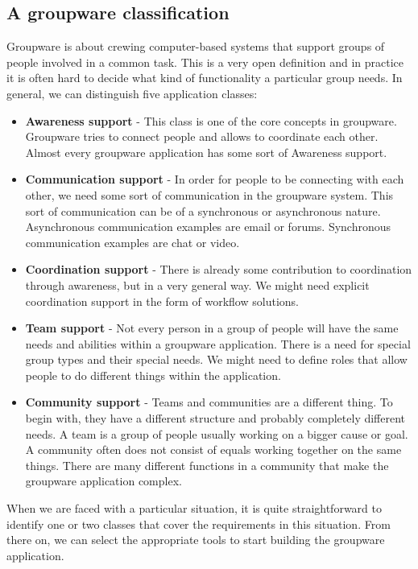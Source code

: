 
\subsection{A groupware classification}

Groupware is about crewing computer-based systems that support groups of people involved in a common task. This is a very open definition and in practice it is often hard to decide what kind of functionality a particular group needs. In general, we can distinguish five application classes:

\begin{itemize}
\item{\textbf{Awareness support} - This class is one of the core concepts in groupware. Groupware tries to connect people and allows to coordinate each other. Almost every groupware application has some sort of Awareness support.}
\item{\textbf{Communication support} - In order for people to be connecting with each other, we need some sort of communication in the groupware system. This sort of communication can be of a synchronous or asynchronous nature. Asynchronous communication examples are email or forums. Synchronous communication examples are chat or video.}
\item{\textbf{Coordination support} - There is already some contribution to coordination through awareness, but in a very general way. We might need explicit coordination support in the form of workflow solutions.}
\item{\textbf{Team support} - Not every person in a group of people will have the same needs and abilities within a groupware application. There is a need for special group types and their special needs. We might need to define roles that allow people to do different things within the application.}
\item{\textbf{Community support} - Teams and communities are a different thing. To begin with, they have a different structure and probably completely different needs. A team is a group of people usually working on a bigger cause or goal. A community often does not consist of equals working together on the same things. There are many different functions in a community that make the groupware application complex.}
\end{itemize}

When we are faced with a particular situation, it is quite straightforward to identify one or two classes that cover the requirements in this situation. From there on, we can select the appropriate tools to start building the groupware application.

